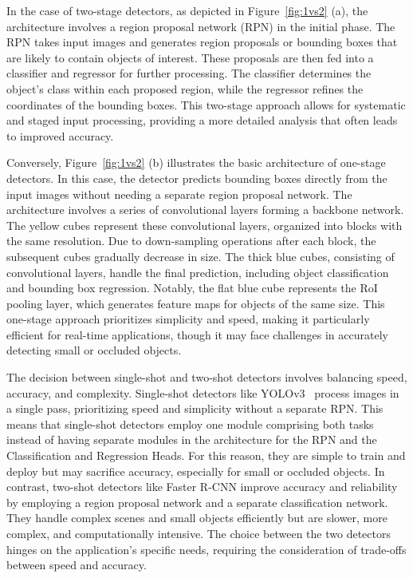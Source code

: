 In the case of two-stage detectors, as depicted in Figure~\ref{fig:1vs2} (a), the architecture involves a region proposal network (RPN) in the initial phase.
The RPN takes input images and generates region proposals or bounding boxes that are likely to contain objects of interest.
These proposals are then fed into a classifier and regressor for further processing.
The classifier determines the object's class within each proposed region, while the regressor refines the coordinates of the bounding boxes.
This two-stage approach allows for systematic and staged input processing, providing a more detailed analysis that often leads to improved accuracy.

Conversely, Figure~\ref{fig:1vs2} (b) illustrates the basic architecture of one-stage detectors.
In this case, the detector predicts bounding boxes directly from the input images without needing a separate region proposal network.
The architecture involves a series of convolutional layers forming a backbone network.
The yellow cubes represent these convolutional layers, organized into blocks with the same resolution.
Due to down-sampling operations after each block, the subsequent cubes gradually decrease in size.
The thick blue cubes, consisting of convolutional layers, handle the final prediction, including object classification and bounding box regression.
Notably, the flat blue cube represents the RoI pooling layer, which generates feature maps for objects of the same size.
This one-stage approach prioritizes simplicity and speed, making it particularly efficient for real-time applications, though it may face challenges in accurately detecting small or occluded objects.


The decision between single-shot and two-shot detectors involves balancing speed, accuracy, and complexity.
Single-shot detectors like YOLOv3~\cite{YOLOv3} process images in a single pass, prioritizing speed and simplicity without a separate RPN. This means that single-shot detectors employ one module comprising both tasks instead of having separate modules in the architecture for the RPN and the Classification and Regression Heads.
For this reason, they are simple to train and deploy but may sacrifice accuracy, especially for small or occluded objects.
In contrast, two-shot detectors like Faster R-CNN improve accuracy and reliability by employing a region proposal network and a separate classification network.
They handle complex scenes and small objects efficiently but are slower, more complex, and computationally intensive.
The choice between the two detectors hinges on the application's specific needs, requiring the consideration of trade-offs between speed and accuracy.


